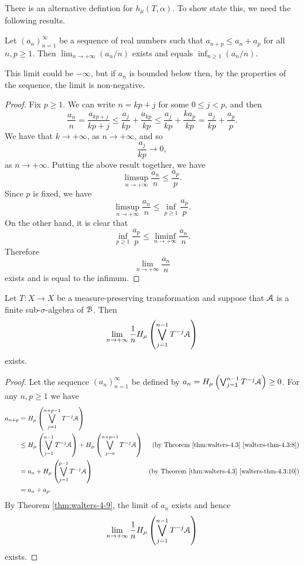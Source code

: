 There is an alternative defintion for $h_\mu(T, \alpha)$. To show state this, we need the following results.

\begin{theorem} \label{thm:walters-4-9}
	Let $(a_n)_{n = 1}^\infty$ be a sequence of real numbers such that $a_{n + p} \leq a_n + a_p$ for all $n, p \geq 1$. Then $\lim_{n \to +\infty}(a_n / n)$ exists and equals $\inf_{n \geq 1}(a_n / n)$.
	
	This limit could be $-\infty$, but if $a_n$ is bounded below then, by the properties of the sequence, the limit is non-negative.
	\begin{proof}
		Fix $p \geq 1$. We can write $n = kp + j$ for some $0 \leq j < p$, and then
		\[
			\frac{a_n}{n} = \frac{a_{kp + j}}{kp + j} \leq \frac{a_j}{kp} + \frac{a_{kp}}{kp} \leq \frac{a_j}{kp} + \frac{ka_p}{kp} = \frac{a_j}{kp} + \frac{a_p}{p}.
		\]
		We have that $k \to +\infty$, as $n \to +\infty$, and so
		\[
			\frac{a_j}{kp} \to 0,
		\]
		as $n \to +\infty$. Putting the above result together, we have
		\[
			\limsup_{n \to +\infty}{\frac{a_n}{n}} \leq \frac{a_p}{p}.
		\]
		Since $p$ is fixed, we have
		\[
			\limsup_{n \to +\infty}{\frac{a_n}{n}} \leq \inf_{p \geq 1}{\frac{a_p}{p}}.
		\]
		On the other hand, it is clear that
		\[
			\inf_{p \geq 1}{\frac{a_p}{p}} \leq \liminf_{n \to +\infty}{\frac{a_n}{n}}.
		\]
		Therefore
		\[
			\lim_{n \to +\infty}{\frac{a_n}{n}}
		\]
		exists and is equal to the infimum.
	\end{proof}
\end{theorem}

\begin{corollary} \label{cor:walters-4-9-1}
	Let $T : X \to X$ be a measure-preserving transformation and suppose that $\mathcal{A}$ is a finite sub-$\sigma$-algebra of $\mathcal{B}$. Then
	\[
		\lim_{n \to +\infty}{\frac{1}{n} H_\mu\left(\bigvee_{j = 1}^{n - 1}{T^{-j}{\mathcal{A}}}\right)}
	\]
	exists.
	\begin{proof}
		Let the sequence $(a_n)_{n = 1}^\infty$ be defined by $a_n = H_\mu\left(\bigvee_{j = 1}^{n - 1}{T^{-j}{\mathcal{A}}}\right) \geq 0$. For any $n, p \geq 1$ we have
		\begin{align*}
			a_{n + p} &= H_\mu\left(\bigvee_{j = 1}^{n + p - 1}{T^{-j}{\mathcal{A}}}\right) \\
				&\leq H_\mu\left(\bigvee_{j = 1}^{n - 1}{T^{-j}{\mathcal{A}}}\right) + H_\mu\left(\bigvee_{j = n}^{n + p - 1}{T^{-j}{\mathcal{A}}}\right) & \text{(by Theorem \ref{thm:walters-4.3} \ref{walters-thm-4.3:8})} \\
				&= a_n + H_\mu\left(\bigvee_{j = 1}^{p - 1}{T^{-j}{\mathcal{A}}}\right) & \text{(by Theorem \ref{thm:walters-4.3} \ref{walters-thm-4.3:10})} \\
				&= a_n + a_p.
		\end{align*}
		By Theorem \ref{thm:walters-4-9}, the limit of $a_n$ exists and hence
		\[
			\lim_{n \to +\infty}{\frac{1}{n} H_\mu\left(\bigvee_{j = 1}^{n - 1}{T^{-j}{\mathcal{A}}}\right)}
		\]
		exists.
	\end{proof}
\end{corollary}

